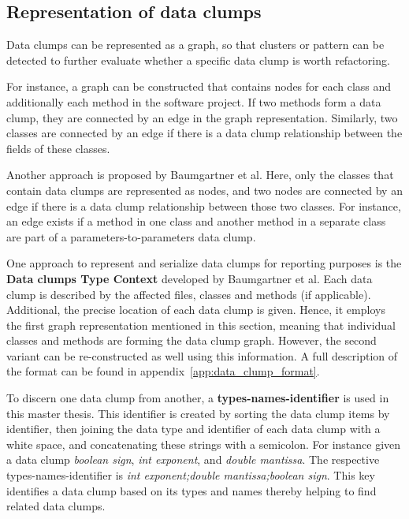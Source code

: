 \subsection{Representation of data clumps}\label{sec:data_clump_graph}

Data clumps can be represented as a graph, so that clusters or pattern can be detected to further evaluate whether a specific data clump is worth refactoring. 

For instance, a graph can be constructed that contains nodes for each class and additionally each method in the software project. If two methods form a data clump, they are connected by an edge in the graph representation. Similarly, two classes  are connected by an edge if there is a data clump relationship between the fields of these classes. 

Another approach is proposed by Baumgartner et al. Here, only the classes that contain data clumps are represented as nodes, and two nodes are connected by an edge if there is a data clump relationship between those two classes. For instance, an edge exists if a method in one class and another method in a separate class are part of a parameters-to-parameters data clump.~\cite{data_clumps_baumgartner}


One approach to represent and serialize data clumps for reporting purposes is the \textbf{Data clumps Type Context} \cite{dataclump_type_context} developed by Baumgartner et al. Each data clump is described by the affected files, classes and methods (if applicable). Additional, the precise location of each data clump is given. Hence,  it employs the first graph representation mentioned in this section, meaning that individual classes and methods are forming the data clump graph. However, the second variant can be re-constructed as well using this information. 
A full description of the format can be found in appendix~\ref{app:data_clump_format}.

To discern one data clump from another, a \textbf{types-names-identifier} is used in this master thesis. This identifier is created by sorting the data clump items by identifier, then joining the data type and identifier of each data clump with a white space, and concatenating these strings with a semicolon. For instance given a data clump \textit{boolean sign}, \textit{int exponent}, and \textit{double mantissa}. The respective types-names-identifier is \textit{int exponent;double mantissa;boolean sign}. This key identifies a data clump based on its types and names thereby helping to find related data clumps. 

